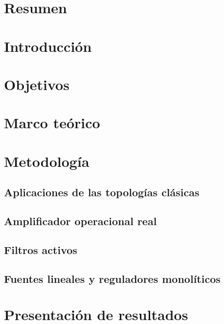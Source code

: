 \documentclass{article}
\begin{document}

\tableofcontents
\newpage
\section{Resumen}


\section{Introducción}


\section{Objetivos}


\section {Marco teórico}





\section{Metodología}
\subsection{Aplicaciones de las topologías clásicas}

\FloatBarrier
\subsection{Amplificador operacional real}

\FloatBarrier
\subsection{Filtros activos}

\FloatBarrier
\subsection{Fuentes lineales y reguladores monolíticos}




\section{Presentación de resultados}
\end{document}
